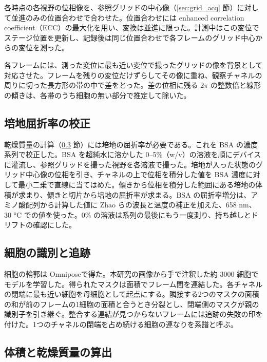 各時点の各視野の位相像を、参照グリッドの中心像（\ref{sec:grid_acq} 節）に対して並進のみの位置合わせで合わせた。位置合わせには enhanced correlation coefficient（ECC）の最大化\cite{evangelidis2008parametric}を用い、変換は並進に限った。計測中はこの変位でステージ位置を更新し、記録後は同じ位置合わせで各フレームのグリッド中心からの変位を測った。

各フレームには、測った変位に最も近い変位で撮ったグリッドの像を背景として対応させた。フレームを残りの変位だけずらしてその像に重ね、観察チャネルの周りに切った長方形の帯の中で差をとった。差の位相に残る $2\pi$ の整数倍と線形の傾きは、各帯のうち細胞の無い部分で推定して除いた。

\subsection{培地屈折率の校正}
\label{sec:calibration}

乾燥質量の計算（\ref{sec:drymass} 節）には培地の屈折率が必要である。これを BSA の濃度系列で校正した。BSA を超純水に溶かした 0--5\%（w/v）の溶液を順にデバイスに灌流し、参照グリッドを撮った視野を各溶液で撮った。培地が入った状態のグリッド中心像の位相を引き、チャネルの上で位相を積分した値を BSA 濃度に対して最小二乗で直線に当てはめた。傾きから位相を積分した範囲にある培地の体積が求まり、傾きと切片から培地の屈折率が求まる。BSA の屈折率増分は、アミノ酸配列から計算した値に Zhao ら\cite{zhao2011distribution}の波長と温度の補正を加えた、658 nm、30 °C での値を使った。0\% の溶液は系列の最後にもう一度測り、持ち越しとドリフトの確認にした。

\subsection{細胞の識別と追跡}
\label{sec:tracking}

細胞の輪郭は Omnipose\cite{cutler2022omnipose}で得た。本研究の画像から手で注釈した約 3000 細胞でモデルを学習した。得られたマスクは面積でフレーム間を連結した。各チャネルの閉端に最も近い細胞を母細胞として起点にする。隣接する2つのマスクの面積の和が前のフレームの1細胞の面積と合うとき分裂とし、閉端側のマスクが親の識別子を引き継ぐ。整合する連結が見つからないフレームには追跡の失敗の印を付けた。1つのチャネルの閉端を占め続ける細胞の連なりを系譜と呼ぶ。

\subsection{体積と乾燥質量の算出}
\label{sec:drymass}

